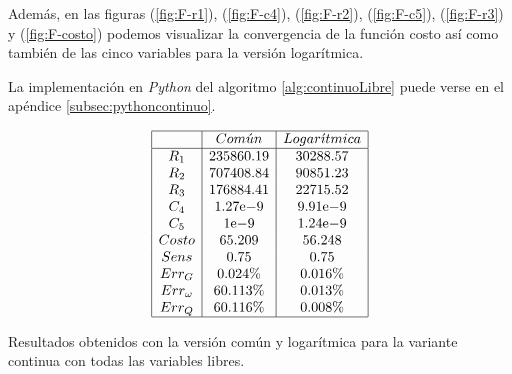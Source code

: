 \documentclass{llncs}
\newcommand{\expnumber}[2]{{#1}\mathrm{e}{#2}}
\begin{document}
	Además, en las figuras (\ref{fig:F-r1}), (\ref{fig:F-c4}), (\ref{fig:F-r2}), (\ref{fig:F-c5}), (\ref{fig:F-r3}) y (\ref{fig:F-costo}) 
	podemos visualizar la convergencia de la función costo así como también de las cinco variables para la versión logarítmica.
	
	La implementación en \textit{Python} del algoritmo \ref{alg:continuoLibre} puede verse en el apéndice \ref{subsec:pythoncontinuo}.
	
	\begin{table}[!h]
		$$
		\begin{array}{|c|c|c|}
		\hline
		 & Com\acute{u}n & Logar\acute{\imath}tmica \\
                \hline
                R_1 & 235860.19  & 30288.57 \\
                R_2 & 707408.84 & 90851.23 \\
                R_3 & 176884.41  & 22715.52 \\
                C_4 & \expnumber{1.27}{-9}  & \expnumber{9.91}{-9}\\
                C_5 & \expnumber{1}{-9} & \expnumber{1.24}{-9}\\
                Costo & 65.209 &  56.248\\
                Sens & 0.75 & 0.75 \\
                Err_G & 0.024\%  & 0.016\%\\
                Err_{\omega} & 60.113\%  &  0.013\%\\
                Err_Q & 60.116\%  &  0.008\%\\
		\hline
		\end{array}
		$$
		\caption{Resultados obtenidos con la versión común y logarítmica para la variante continua con todas las variables libres.}
		\label{cuadroSols1}
	\end{table}
	
\end{document}
